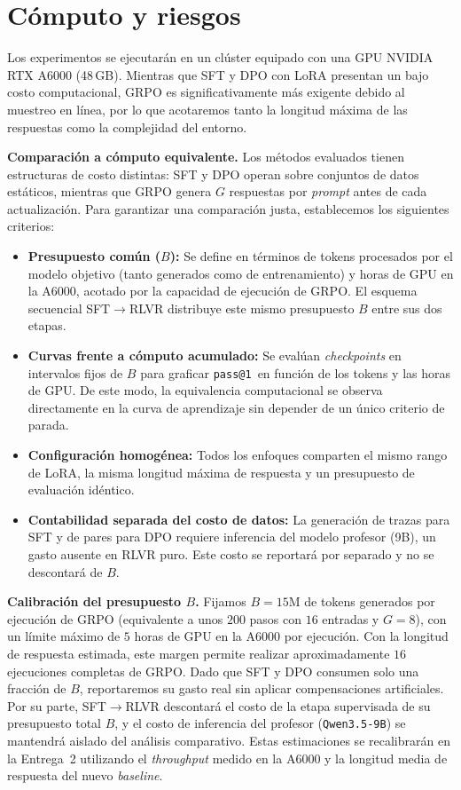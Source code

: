 \documentclass[letterpaper,11pt]{article}
\makeatletter
\newcommand{\passuno}{\texttt{pass@1}}
\makeatother
\begin{document}
\section{Cómputo y riesgos}\label{sec:computo}

Los experimentos se ejecutarán en un clúster equipado con una GPU NVIDIA RTX A6000 (48\,GB). Mientras que SFT y DPO con LoRA presentan un bajo costo computacional, GRPO es significativamente más exigente debido al muestreo en línea, por lo que acotaremos tanto la longitud máxima de las respuestas como la complejidad del entorno.

\textbf{Comparación a cómputo equivalente.} Los métodos evaluados tienen estructuras de costo distintas: SFT y DPO operan sobre conjuntos de datos estáticos, mientras que GRPO genera $G$ respuestas por \emph{prompt} antes de cada actualización. Para garantizar una comparación justa, establecemos los siguientes criterios:
\begin{itemize}
  \item \textbf{Presupuesto común ($B$):} Se define en términos de tokens procesados por el modelo objetivo (tanto generados como de entrenamiento) y horas de GPU en la A6000, acotado por la capacidad de ejecución de GRPO. El esquema secuencial SFT$\to$RLVR distribuye este mismo presupuesto $B$ entre sus dos etapas.
  \item \textbf{Curvas frente a cómputo acumulado:} Se evalúan \emph{checkpoints} en intervalos fijos de $B$ para graficar \passuno\ en función de los tokens y las horas de GPU. De este modo, la equivalencia computacional se observa directamente en la curva de aprendizaje sin depender de un único criterio de parada.
  \item \textbf{Configuración homogénea:} Todos los enfoques comparten el mismo rango de LoRA, la misma longitud máxima de respuesta y un presupuesto de evaluación idéntico.
  \item \textbf{Contabilidad separada del costo de datos:} La generación de trazas para SFT y de pares para DPO requiere inferencia del modelo profesor (9B), un gasto ausente en RLVR puro. Este costo se reportará por separado y no se descontará de $B$.
\end{itemize}

\textbf{Calibración del presupuesto $B$.} Fijamos $B = 15\text{M}$ de tokens generados por ejecución de GRPO (equivalente a unos $200$ pasos con $16$ entradas y $G=8$), con un límite máximo de $5$ horas de GPU en la A6000 por ejecución. Con la longitud de respuesta estimada, este margen permite realizar aproximadamente $16$ ejecuciones completas de GRPO. Dado que SFT y DPO consumen solo una fracción de $B$, reportaremos su gasto real sin aplicar compensaciones artificiales. Por su parte, SFT$\to$RLVR descontará el costo de la etapa supervisada de su presupuesto total $B$, y el costo de inferencia del profesor (\texttt{Qwen3.5-9B}) se mantendrá aislado del análisis comparativo. Estas estimaciones se recalibrarán en la Entrega~2 utilizando el \emph{throughput} medido en la A6000 y la longitud media de respuesta del nuevo \emph{baseline}.
\end{document}
